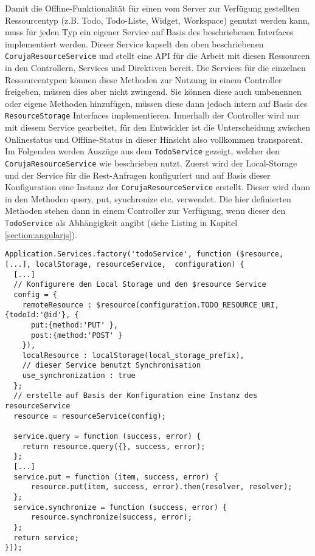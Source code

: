 Damit die Offline-Funktionalität für einen vom Server zur Verfügung gestellten Ressourcentyp (z.B. Todo, Todo-Liste, Widget, Workspace) genutzt werden kann, muss für jeden Typ ein eigener Service auf Basis des beschriebenen Interfaces implementiert werden. Dieser Service kapselt den oben beschriebenen \texttt{CorujaResourceService} und stellt eine API für die Arbeit mit diesen Ressourcen in den Controllern, Services und Direktiven bereit. Die Services für die einzelnen Ressourcentypen können diese Methoden zur Nutzung in einem Controller freigeben, müssen dies aber nicht zwingend. Sie können diese auch umbenennen oder eigene Methoden hinzufügen, müssen diese dann jedoch intern auf Basis des \texttt{ResourceStorage} Interfaces implementieren. Innerhalb der Controller wird nur mit diesem Service gearbeitet, für den Entwickler ist die Unterscheidung zwischen Onlinestatus und Offline-Status in dieser Hinsicht also vollkommen transparent. Im Folgenden werden Auszüge aus dem \texttt{TodoService} gezeigt, welcher den \texttt{CorujaResourceService} wie beschrieben nutzt. Zuerst wird der Local-Storage und der Service für die Rest-Anfragen konfiguriert und auf Basis dieser Konfiguration eine Instanz der \texttt{CorujaResourceService} erstellt. Dieser wird dann in den Methoden query, put, synchronize etc. verwendet. Die hier definierten Methoden stehen dann in einem Controller zur Verfügung, wenn dieser den \texttt{TodoService} als Abhängigkeit angibt (siehe Listing in Kapitel \ref{section:angularjs}).
\begin{lstlisting}
Application.Services.factory('todoService', function ($resource, [...], localStorage, resourceService,  configuration) {
  [...]
  // Konfigurere den Local Storage und den $resource Service
  config = {
    remoteResource : $resource(configuration.TODO_RESOURCE_URI, {todoId:'@id'}, {
      put:{method:'PUT' },
      post:{method:'POST' }
    }),
    localResource : localStorage(local_storage_prefix),
    // dieser Service benutzt Synchronisation
    use_synchronization : true
  };   
  // erstelle auf Basis der Konfiguration eine Instanz des resourceService
  resource = resourceService(config);
    
  service.query = function (success, error) {
    return resource.query({}, success, error);
  }; 
  [...]
  service.put = function (item, success, error) {
      resource.put(item, success, error).then(resolver, resolver);
  };  
  service.synchronize = function (success, error) {
      resource.synchronize(success, error);
  };
  return service;
}]);
\end{lstlisting}

